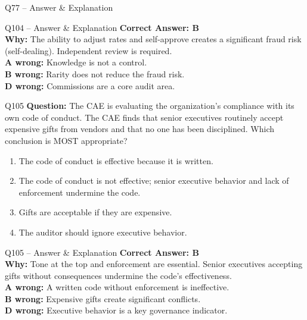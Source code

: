 \documentclass[aspectratio=169,10pt]{beamer}
\begin{document}
\begin{frame}[t]{Q77 -- Answer \& Explanation}
	\begin{frame}[t]{Q104 -- Answer \& Explanation}
		\small
		\textbf{Correct Answer: B} \\[4pt]
		\textbf{Why:} The ability to adjust rates and self-approve creates a significant fraud risk (self-dealing). Independent review is required. \\[4pt]
		\textbf{A wrong:} Knowledge is not a control. \\[2pt]
		\textbf{B wrong:} Rarity does not reduce the fraud risk. \\[2pt]
		\textbf{D wrong:} Commissions are a core audit area.
	\end{frame}
	
	\begin{frame}[t]{Q105}
		\small
		\textbf{Question:} The CAE is evaluating the organization's compliance with its own code of conduct. The CAE finds that senior executives routinely accept expensive gifts from vendors and that no one has been disciplined. Which conclusion is MOST appropriate?
		\begin{enumerate}[label=\Alph*.,itemsep=1pt,topsep=2pt]
			\item The code of conduct is effective because it is written.
			\item The code of conduct is not effective; senior executive behavior and lack of enforcement undermine the code.
			\item Gifts are acceptable if they are expensive.
			\item The auditor should ignore executive behavior.
		\end{enumerate}
	\end{frame}
	
	\begin{frame}[t]{Q105 -- Answer \& Explanation}
		\small
		\textbf{Correct Answer: B} \\[4pt]
		\textbf{Why:} Tone at the top and enforcement are essential. Senior executives accepting gifts without consequences undermine the code's effectiveness. \\[4pt]
		\textbf{A wrong:} A written code without enforcement is ineffective. \\[2pt]
		\textbf{B wrong:} Expensive gifts create significant conflicts. \\[2pt]
		\textbf{D wrong:} Executive behavior is a key governance indicator.
	\end{frame}
	

\end{frame}
\end{document}
